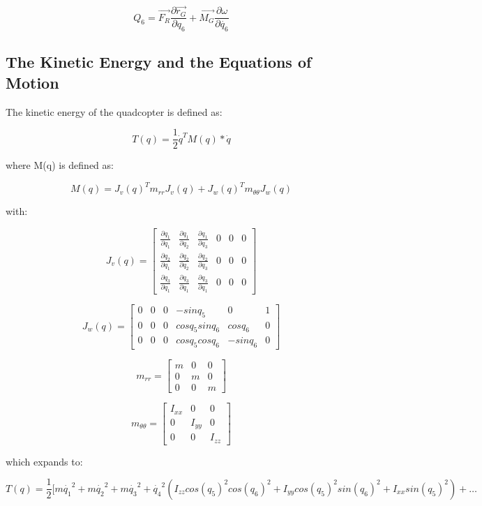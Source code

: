 \documentclass[10pt, letterpaper]{article}
\begin{document}
\[
Q_{6}=\overrightarrow{F_{R}}\frac{\partial\overrightarrow{r_{G}}}{\partial q_{6}}+\overrightarrow{M_{G}}\frac{\partial\omega}{\partial\dot{q_{6}}}
\]


\subsection*{The Kinetic Energy and the Equations of Motion}

The kinetic energy of the quadcopter is defined as:

\[
T(q)=\frac{1}{2}\dot{q}^{T}M(q)*\dot{q}
\]

where M(q) is defined as:

\[
M(q)=J_{v}(q)^{T}m_{rr}J_{v}(q)+J_{w}(q)^{T}m_{\theta\theta}J_{w}(q)
\]

with:

\[
J_{v}(q)=\left[\begin{array}{cccccc}
\frac{\partial q_{1}}{\partial q_{1}} & \frac{\partial q_{1}}{\partial q_{2}} & \frac{\partial q_{1}}{\partial q_{3}} & 0 & 0 & 0\\
\frac{\partial q_{2}}{\partial q_{1}} & \frac{\partial q_{2}}{\partial q_{2}} & \frac{\partial q_{2}}{\partial q_{3}} & 0 & 0 & 0\\
\frac{\partial q_{3}}{\partial q_{1}} & \frac{\partial q_{3}}{\partial q_{1}} & \frac{\partial q_{3}}{\partial q_{1}} & 0 & 0 & 0
\end{array}\right]
\]

\[
J_{w}(q)=\left[\begin{array}{cccccc}
0 & 0 & 0 & -sinq_{5} & 0 & 1\\
0 & 0 & 0 & cosq_{5}sinq_{6} & cosq_{6} & 0\\
0 & 0 & 0 & cosq_{5}cosq_{6} & -sinq_{6} & 0
\end{array}\right]
\]

\[
m_{rr}=\left[\begin{array}{ccc}
m & 0 & 0\\
0 & m & 0\\
0 & 0 & m
\end{array}\right]
\]

\[
m_{\theta\theta}=\left[\begin{array}{ccc}
I_{xx} & 0 & 0\\
0 & I_{yy} & 0\\
0 & 0 & I_{zz}
\end{array}\right]
\]

which expands to:

\[
T(q)=\frac{1}{2}[m\dot{q_{1}}^{2}+m\dot{q_{2}}^{2}+m\dot{q_{3}}^{2}+\dot{q_{4}}^{2}(I_{zz}cos(q_{5})^{2}cos(q_{6})^{2}+I_{yy}cos(q_{5})^{2}sin(q_{6})^{2}+I_{xx}sin(q_{5})^{2})+\ldots
\]
\end{document}
